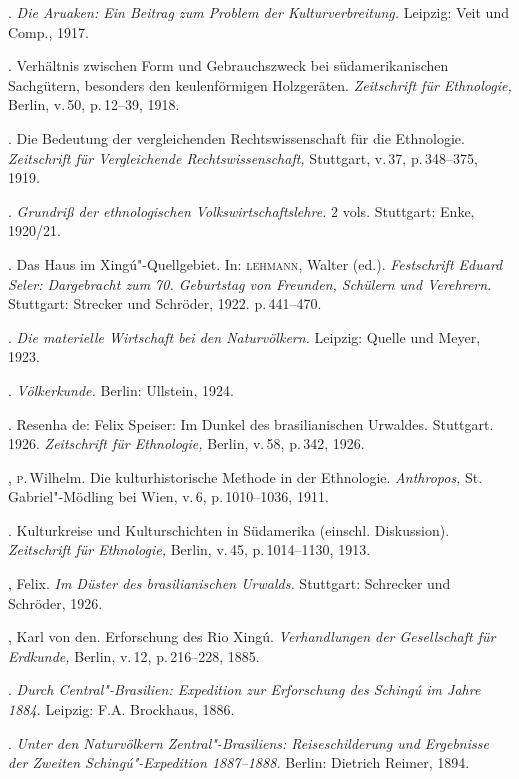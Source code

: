 \begin{bibliohedra}
 \titidem. \textit{Die Aruaken: Ein Beitrag zum Problem der
 Kulturverbreitung.} Leipzig: Veit und Comp., 1917.

 \titidem. Verhältnis zwischen Form und Gebrauchszweck bei
 südamerikanischen Sachgütern, besonders den keulenförmigen Holzgeräten.
 \textit{Zeitschrift für Ethnologie,} Berlin, v.\,50, p.\,12--39, 1918.

 \titidem. Die Bedeutung der vergleichenden
 Rechtswissenschaft für die Ethnologie. \textit{Zeitschrift für
 Vergleichende Rechtswissenschaft,} Stuttgart, v.\,37, p.\,348--375, 1919.

 \titidem. \textit{Grundriß der ethnologischen
 Volkswirtschaftslehre.} 2 vols. Stuttgart: Enke, 1920/21.

 \titidem. Das Haus im Xingú"-Quellgebiet. In: \textsc{lehmann}, Walter
 (ed.). \textit{Festschrift Eduard Seler: Dargebracht zum 70. Geburtstag
 von Freunden, Schülern und Verehrern.} Stuttgart: Strecker und Schröder,
 1922. p.\,441--470.

 \titidem. \textit{Die materielle Wirtschaft bei den
 Naturvölkern.} Leipzig: Quelle und Meyer, 1923.

 \titidem. \textit{Völkerkunde.} Berlin: Ullstein, 1924.

 \titidem. Resenha de: Felix Speiser: Im Dunkel des
 brasilianischen Urwaldes. Stuttgart. 1926. \textit{Zeitschrift für
 Ethnologie,} Berlin, v.\,58, p.\,342, 1926.

 , \textsc{p}.\,Wilhelm. Die kulturhistorische Methode in der Ethnologie.
 \textit{Anthropos,} St. Gabriel"-Mödling bei Wien, v.\,6, p.\,1010--1036,
 1911.

 \titidem. Kulturkreise und Kulturschichten in Südamerika
 (einschl. Diskussion). \textit{Zeitschrift für Ethnologie,} Berlin, v.\,45, p.\,1014--1130, 1913.

 , Felix. \textit{Im Düster des brasilianischen Urwalds.}
 Stuttgart: Schrecker und Schröder, 1926.

 , Karl von den. Erforschung des Rio Xingú. \textit{Verhandlungen
 der Gesellschaft für Erdkunde,} Berlin, v.\,12, p.\,216--228, 1885.

 \titidem. \textit{Durch Central"-Brasilien: Expedition zur
 Erforschung des Schingú im Jahre 1884.} Leipzig: F.A. Brockhaus, 1886.

 \titidem. \textit{Unter den Naturvölkern Zentral"-Brasiliens:
 Reiseschilderung und Ergebnisse der Zweiten Schingú"-Expedition
 1887--1888.} Berlin: Dietrich Reimer, 1894.


\end{bibliohedra}
